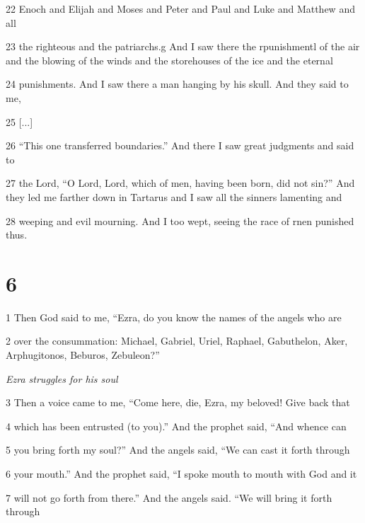 \par 22 Enoch and Elijah and Moses and Peter and Paul and Luke and Matthew and all

\par 23 the righteous and the patriarchs.g And I saw there the rpunishmentl of the air and the blowing of the winds and the storehouses of the ice and the eternal

\par 24 punishments. And I saw there a man hanging by his skull. And they said to me,

\par 25 [...]

\par 26 “This one transferred boundaries.” And there I saw great judgments and said to

\par 27 the Lord, “O Lord, Lord, which of men, having been born, did not sin?” And they led me farther down in Tartarus and I saw all the sinners lamenting and

\par 28 weeping and evil mourning. And I too wept, seeing the race of rnen punished thus.

\chapter{6}

\par 1 Then God said to me, “Ezra, do you know the names of the angels who are

\par 2 over the consummation: Michael, Gabriel, Uriel, Raphael, Gabuthelon, Aker, Arphugitonos, Beburos, Zebuleon?”

\par \textit{Ezra struggles for his soul}

\par 3 Then a voice came to me, “Come here, die, Ezra, my beloved! Give back that

\par 4 which has been entrusted (to you).” And the prophet said, “And whence can

\par 5 you bring forth my soul?” And the angels said, “We can cast it forth through

\par 6 your mouth.” And the prophet said, “I spoke mouth to mouth with God and it

\par 7 will not go forth from there.” And the angels said. “We will bring it forth through

